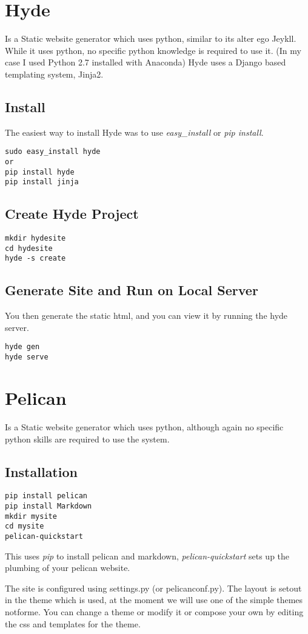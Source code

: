 \documentclass[12pt]{article}			%
\begin{document}
\newpage
\section{Hyde}
Is a Static website generator which uses python, similar to its alter ego Jeykll.
While it uses python, no specific python knowledge is required to use it. (In my case I used Python 2.7 installed with Anaconda) Hyde uses a Django based templating system, Jinja2. 

\subsection{Install}
The easiest way to install Hyde was to use \textit{easy\_install} or \textit{pip install}.
\begin{verbatim}
sudo easy_install hyde
or
pip install hyde
pip install jinja
\end{verbatim}

\subsection{Create Hyde Project}
\begin{verbatim}
mkdir hydesite
cd hydesite
hyde -s create

\end{verbatim}

\subsection{Generate Site and Run on Local Server}
You then generate the static html, and you can view it by running the hyde server.
\begin{verbatim}
hyde gen
hyde serve
\end{verbatim}

\newpage
\section{Pelican}
Is a Static website generator which uses python, although again no specific python skills are required to use the system.
\subsection{Installation}
\begin{verbatim}
pip install pelican
pip install Markdown
mkdir mysite
cd mysite
pelican-quickstart
\end{verbatim}
This uses \textit{pip} to install pelican and markdown, \textit{pelican-quickstart} sets up the plumbing of your pelican website.\par
The site is configured using settings.py (or pelicanconf.py).
The layout is setout in the theme which is used, at the moment we will use one of the simple themes notforme. You can change a theme or modify it or compose your own by editing the css and templates for the theme.
\end{document}
